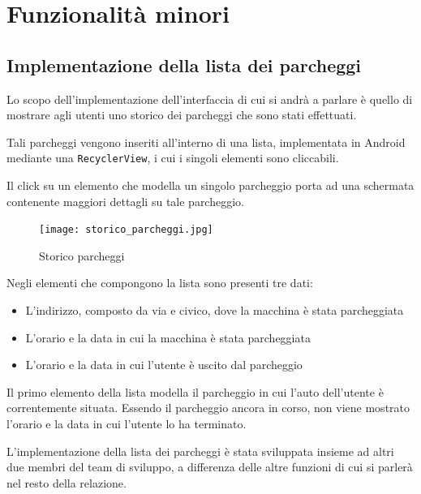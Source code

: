 \hypertarget{progettazione-ed-implementazione-di-funzionalituxe0-minori}{%
\section{Funzionalità minori}\label{progettazione-ed-implementazione-di-funzionalituxe0-minori}}

\hypertarget{implementazione-della-lista-dei-parcheggi}{%
\subsection{Implementazione della lista dei parcheggi}\label{implementazione-della-lista-dei-parcheggi}}

Lo scopo dell'implementazione dell'interfaccia di cui si andrà a parlare è quello di mostrare agli utenti uno storico dei parcheggi che sono stati effettuati.

Tali parcheggi vengono inseriti all'interno di una lista, implementata in Android mediante una \texttt{RecyclerView}, i cui i singoli elementi sono cliccabili.

Il click su un elemento che modella un singolo parcheggio porta ad una schermata contenente maggiori dettagli su tale parcheggio.

\begin{figure}[H]
\centering
\texttt{[image: storico\_parcheggi.jpg]}
\caption{Storico parcheggi}
\label{storico-parcheggi}
\end{figure}

Negli elementi che compongono la lista sono presenti tre dati:

\begin{itemize}
    \item L'indirizzo, composto da via e civico, dove la macchina è stata parcheggiata
    \item L'orario e la data in cui la macchina è stata parcheggiata
    \item L'orario e la data in cui l'utente è uscito dal parcheggio
\end{itemize}
Il primo elemento della lista modella il parcheggio in cui l'auto dell'utente è correntemente situata. Essendo il parcheggio ancora in corso, non viene mostrato l'orario e la data in cui l'utente lo ha terminato. 

L'implementazione della lista dei parcheggi è stata sviluppata insieme ad altri due membri del team di sviluppo, a differenza delle altre funzioni di cui si parlerà nel resto della relazione.

